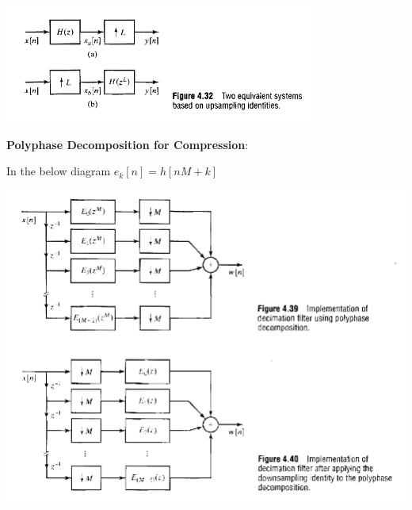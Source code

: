 \documentclass[11pt]{article}
\begin{document}
  \includegraphics[scale=0.75]{graphics/expander_noble.png}

  \textbf{Polyphase Decomposition for Compression}:

  In the below diagram \(e_{k}[n] = h[nM + k]\)

  \includegraphics[scale=0.82]{graphics/polyphase_down.png}
\end{document}

